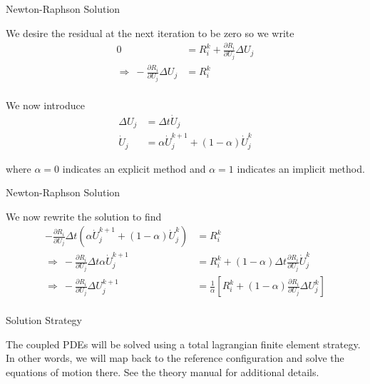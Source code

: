\documentclass[11pt]{beamer}
\begin{document}
\begin{frame}{Newton-Raphson Solution}

We desire the residual at the next iteration to be zero so we write
\begin{equation}
\begin{aligned}
0 &= R_i^k + \frac{\partial R_i}{\partial U_j} \Delta U_j\\
\Rightarrow\ -\frac{\partial R_i}{\partial U_j} \Delta U_j &= R_i^k\\
\end{aligned}
\end{equation}

We now introduce
\begin{align*}
\Delta U_j &= \Delta t \dot{U}_j\\
\dot{U}_j &= \alpha \dot{U}_j^{k+1} + \left(1-\alpha\right) \dot{U}_j^{k}
\end{align*}

where $\alpha = 0$ indicates an explicit method and $\alpha = 1$ indicates an implicit method.

\end{frame}

\begin{frame}{Newton-Raphson Solution}

We now rewrite the solution to find
\begin{equation}
\begin{aligned}
-\frac{\partial R_i}{\partial U_j} \Delta t \left(\alpha \dot{U}_j^{k+1} + \left(1-\alpha\right) \dot{U}_j^{k}\right) &= R_i^k\\
\Rightarrow\ -\frac{\partial R_i}{\partial U_j} \Delta t \alpha \dot{U}_j^{k+1} &= R_i^k + \left(1-\alpha\right) \Delta t \frac{\partial R_i}{\partial U_j} \dot{U}_j^k\\
\Rightarrow\ - \frac{\partial R_i}{\partial U_j} \Delta U_j^{k+1} &= \frac{1}{\alpha} \left[R_i^k + \left(1-\alpha\right) \frac{\partial R_i}{\partial U_j} \Delta U_j^k\right]\\
\end{aligned}
\end{equation}

\end{frame}

\begin{frame}{Solution Strategy}

The coupled PDEs will be solved using a total lagrangian finite element strategy. In other words, we will map back to the reference configuration and solve the equations of motion there. See the theory manual for additional details.

\end{frame}
\end{document}
